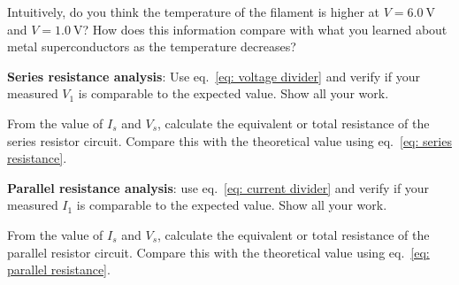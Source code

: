 \documentclass[addpoints]{physlabs}
\begin{document}
\begin{postlab}
\begin{solution}[1.5cm]
    \end{solution}

    \filbreak
    \question[1] Intuitively, do you think the temperature of the filament is higher at $V=\qty{6.0}{\volt}$ and $V=\qty{1.0}{\volt}$? How does this information compare with what you learned about metal superconductors as the temperature decreases?
    \begin{solution}[1.5cm]
        
    \end{solution}

    \filbreak
    \question[1] \textbf{Series resistance analysis}: Use eq.~\ref{eq: voltage divider} and verify if your measured $V_1$ is comparable to the expected value. Show all your work.
    \begin{solution}[4cm]
        
    \end{solution}

    \filbreak
    \question[1] From the value of $I_s$ and $V_s$, calculate the equivalent or total resistance of the series resistor circuit. Compare this with the theoretical value using eq.~\ref{eq: series resistance}.
    \begin{solution}[3cm]
        
    \end{solution}

    \filbreak
    \question[1] \textbf{Parallel resistance analysis}: use eq.~\ref{eq: current divider} and verify if your measured $I_1$ is comparable to the expected value. Show all your work.
    \begin{solution}[4cm]
        
    \end{solution}

    \filbreak
    \question[1] From the value of $I_s$ and $V_s$, calculate the equivalent or total resistance of the parallel resistor circuit. Compare this with the theoretical value using eq.~\ref{eq: parallel resistance}.
    \begin{solution}[3cm]
        
    \end{solution}




    \newpage


\end{postlab}
\end{document}
